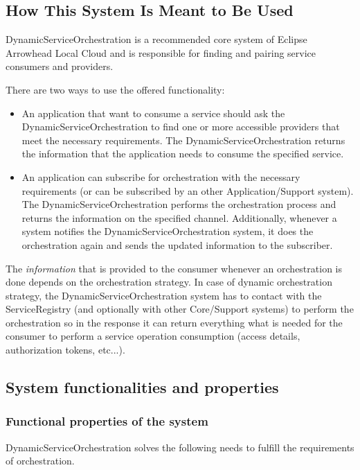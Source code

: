 \documentclass[a4paper]{arrowhead}
\begin{document}
\subsection{How This System Is Meant to Be Used}
\label{sec:use}

DynamicServiceOrchestration is a recommended core system of Eclipse Arrowhead Local Cloud and is responsible for finding and pairing service consumers and providers. 

There are two ways to use the offered functionality:

\begin{itemize}
    \item An application that want to consume a service should ask the DynamicServiceOrchestration to find one or more accessible providers that meet the necessary requirements. The DynamicServiceOrchestration returns the information that the application needs to consume the specified service.
    \item An application can subscribe for orchestration with the necessary requirements (or can be subscribed by an other Application/Support system). The DynamicServiceOrchestration performs the orchestration process and returns the information on the specified channel. Additionally, whenever a system notifies the DynamicServiceOrchestration system, it does the orchestration again and sends the updated information to the subscriber.
\end{itemize}

The \textit{information} that is provided to the consumer whenever an orchestration is done depends on the orchestration strategy. In case of dynamic orchestration strategy, the DynamicServiceOrchestration system has to contact with the ServiceRegistry (and optionally with other Core/Support systems) to perform the orchestration so in the response it can return everything what is needed for the consumer to perform a service operation consumption (access details, authorization tokens, etc...).

\subsection{System functionalities and properties}
\label{sec:properties}

\subsubsection {Functional properties of the system}
DynamicServiceOrchestration solves the following needs to fulfill the requirements of orchestration.
\end{document}
